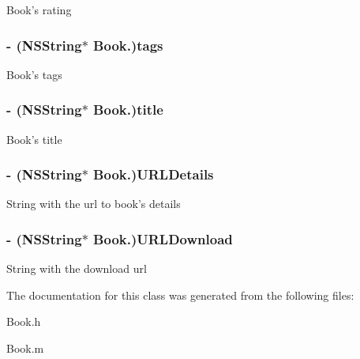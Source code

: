 \label{interface_book_a8afeec1f31606be6859a1db6d85c2692}
Book's rating \hypertarget{interface_book_a7a8f43ac597fb2a8280a4323157844d3}{
\subsubsection[{tags}]{\setlength{\rightskip}{0pt plus 5cm}-\/ (NSString$\ast$ Book.)tags}}
\label{interface_book_a7a8f43ac597fb2a8280a4323157844d3}
Book's tags \hypertarget{interface_book_a507a4a5b02d5d042f6716316e2e5e293}{
\subsubsection[{title}]{\setlength{\rightskip}{0pt plus 5cm}-\/ (NSString$\ast$ Book.)title}}
\label{interface_book_a507a4a5b02d5d042f6716316e2e5e293}
Book's title \hypertarget{interface_book_ae922c5937572505b3675a24bacf61c53}{
\subsubsection[{URLDetails}]{\setlength{\rightskip}{0pt plus 5cm}-\/ (NSString$\ast$ Book.)URLDetails}}
\label{interface_book_ae922c5937572505b3675a24bacf61c53}
String with the url to book's details \hypertarget{interface_book_ac0535b8b5a6b54eacbdb3e36338210e7}{
\subsubsection[{URLDownload}]{\setlength{\rightskip}{0pt plus 5cm}-\/ (NSString$\ast$ Book.)URLDownload}}
\label{interface_book_ac0535b8b5a6b54eacbdb3e36338210e7}
String with the download url 

The documentation for this class was generated from the following files:\begin{DoxyCompactItemize}
\item 
Book.h\item 
Book.m\end{DoxyCompactItemize}
